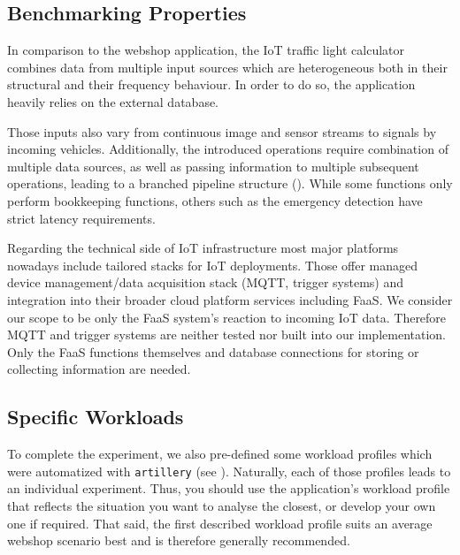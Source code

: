 \documentclass[../main.tex]{subfiles}
\begin{document}
\subsection{Benchmarking Properties}\label{ssec:iotApplicationProperties}

In comparison to the webshop application, the IoT traffic light calculator combines data from multiple input sources
which are heterogeneous both in their structural and their frequency behaviour. 
In order to do so, the application heavily relies on the external database.

Those inputs also vary from continuous image and sensor streams to signals by incoming vehicles. 
Additionally, the introduced operations require combination of multiple data sources, 
as well as passing information to multiple subsequent operations, 
leading to a branched pipeline structure (). 
While some functions only perform bookkeeping functions, others such as the emergency detection have strict latency requirements.

Regarding the technical side of IoT infrastructure most major platforms nowadays include tailored stacks for IoT deployments\footnotemark.
Those offer managed device management/data acquisition stack (MQTT, trigger systems)
and integration into their broader cloud platform services including FaaS.
We consider our scope to be only the FaaS system's reaction to incoming IoT data. 
Therefore MQTT and trigger systems are neither tested nor built into our implementation. 
Only the FaaS functions themselves and database connections for storing or collecting information are needed.


\subsection{Specific Workloads}\label{ssec:iotSpecificWorkloads}

To complete the experiment, we also pre-defined some workload profiles which were automatized with \texttt{artillery}
(see ).
Naturally, each of those profiles leads to an individual experiment.
Thus, you should use the application's workload profile that reflects the situation you want to analyse the closest,
or develop your own one if required.
That said, the first described workload profile suits an average webshop scenario best and is therefore generally recommended.
\end{document}
